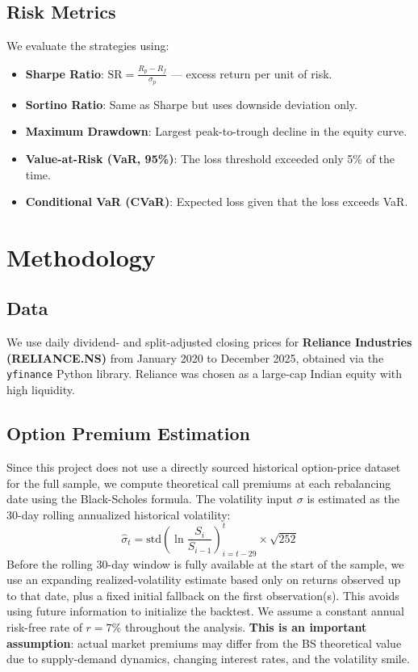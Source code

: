\documentclass[12pt, a4paper]{article}
\begin{document}
\subsection{Risk Metrics}

We evaluate the strategies using:
\begin{itemize}
    \item \textbf{Sharpe Ratio}: $\displaystyle \text{SR} = \frac{R_p - R_f}{\sigma_p}$ — excess return per unit of risk.
    \item \textbf{Sortino Ratio}: Same as Sharpe but uses downside deviation only.
    \item \textbf{Maximum Drawdown}: Largest peak-to-trough decline in the equity curve.
    \item \textbf{Value-at-Risk (VaR, 95\%)}: The loss threshold exceeded only 5\% of the time.
    \item \textbf{Conditional VaR (CVaR)}: Expected loss given that the loss exceeds VaR.
\end{itemize}


\section{Methodology}

\subsection{Data}

We use daily dividend- and split-adjusted closing prices for \textbf{Reliance Industries (RELIANCE.NS)} from January 2020 to December 2025, obtained via the \texttt{yfinance} Python library. Reliance was chosen as a large-cap Indian equity with high liquidity.

\subsection{Option Premium Estimation}

Since this project does not use a directly sourced historical option-price dataset for the full sample, we compute theoretical call premiums at each rebalancing date using the Black-Scholes formula. The volatility input $\sigma$ is estimated as the 30-day rolling annualized historical volatility:
\begin{equation}
    \hat{\sigma}_t = \text{std}\!\left(\ln\frac{S_i}{S_{i-1}}\right)_{i=t-29}^{t} \times \sqrt{252}
\end{equation}
Before the rolling 30-day window is fully available at the start of the sample, we use an expanding realized-volatility estimate based only on returns observed up to that date, plus a fixed initial fallback on the first observation(s). This avoids using future information to initialize the backtest. We assume a constant annual risk-free rate of $r = 7\%$ throughout the analysis. \textbf{This is an important assumption}: actual market premiums may differ from the BS theoretical value due to supply-demand dynamics, changing interest rates, and the volatility smile.
\end{document}
